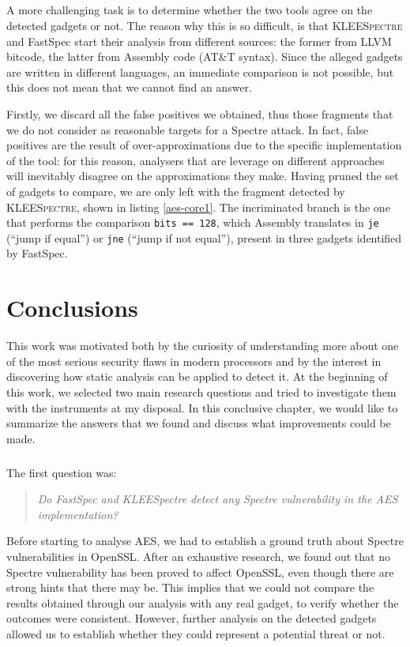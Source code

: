 \documentclass[12pt,a4paper]{book}
\theoremstyle{definition}
\begin{document}
	\paragraph{} A more challenging task is to determine whether the two tools agree on the detected gadgets or not. The reason why this is so difficult, is that \textsc{KLEESpectre} and FastSpec start their analysis from different sources: the former from LLVM bitcode, the latter from Assembly code (AT\&T syntax). Since the alleged gadgets are written in different languages, an immediate comparison is not possible, but this does not mean that we cannot find an answer.
	
	Firstly, we discard all the false positives we obtained, thus those fragments that we do not consider as reasonable targets for a Spectre attack. In fact, false positives are the result of over-approximations due to the specific implementation of the tool: for this reason, analysers that are leverage on different approaches will inevitably disagree on the approximations they make. Having pruned the set of gadgets to compare, we are only left with the fragment detected by \textsc{KLEESpectre}, shown in listing \ref{aes-core1}. The incriminated branch is the one that performs the comparison \texttt{bits == 128}, which Assembly translates in \texttt{je} (``jump if equal'') or \texttt{jne} (``jump if not equal''), present in three gadgets identified by FastSpec. 
	
	\chapter{Conclusions}\label{conclusions}
	
	This work was motivated both by the curiosity of understanding more about one of the most serious security flaws in modern processors and by the interest in discovering how static analysis can be applied to detect it. At the beginning of this work, we selected two main research questions and tried to investigate them with the instruments at my disposal. In this conclusive chapter, we would like to summarize the answers that we found and discuss what improvements could be made.
	\paragraph{} The first question was:
	\begin{quote}
		\textit{Do FastSpec and KLEESpectre detect any Spectre vulnerability in the AES implementation?}
	\end{quote}
	Before starting to analyse AES, we had to establish a ground truth about Spectre vulnerabilities in OpenSSL. After an exhaustive research, we found out that no Spectre vulnerability has been proved to affect OpenSSL, even though there are strong hints that there may be. This implies that we could not compare the results obtained through our analysis with any real gadget, to verify whether the outcomes were consistent. However, further analysis on the detected gadgets allowed us to establish whether they could represent a potential threat or not.
	
\end{document}

